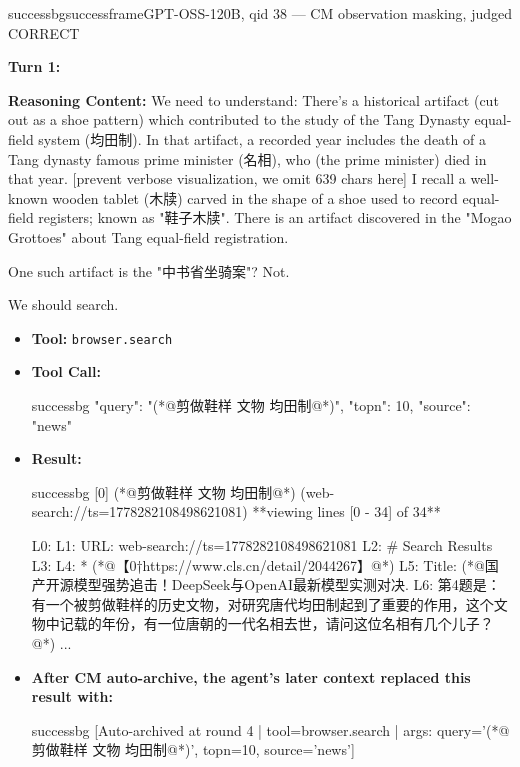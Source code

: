 \begin{casebox}{successbg}{successframe}{GPT-OSS-120B, qid 38 --- CM observation masking, judged CORRECT}

\textbf{Turn 1:}

\textbf{Reasoning Content:} We need to understand: There's a historical artifact (cut out as a shoe pattern) which contributed to the study of the Tang Dynasty equal-field system (均田制). In that artifact, a recorded year includes the death of a Tang dynasty famous prime minister (名相), who (the prime minister) died in that year.
[prevent verbose visualization, we omit 639 chars here]
I recall a well-known wooden tablet (木牍) carved in the shape of a shoe used to record equal-field registers; known as "鞋子木牍". There is an artifact discovered in the "Mogao Grottoes" about Tang equal-field registration.

One such artifact is the "中书省坐骑案"? Not.

We should search.

\vspace{0.3em}
\begin{itemize}[nosep, leftmargin=*, label={}]
    \item \textbf{Tool:} \texttt{browser.search}
    \item \textbf{Tool Call:}
    \vspace{-0.5em}
    \begin{toolcall}{successbg}
{"query": "(*@剪做鞋样 文物 均田制@*)", "topn": 10, "source": "news"}
    \end{toolcall}
    \vspace{-0.5em}
    \item \textbf{Result:}
    \vspace{-0.5em}
    \begin{casecode}{successbg}
[0] (*@剪做鞋样 文物 均田制@*) (web-search://ts=1778282108498621081)
**viewing lines [0 - 34] of 34**

L0: 
L1: URL: web-search://ts=1778282108498621081
L2: \# Search Results
L3: 
L4:   * (*@【0†https://www.cls.cn/detail/2044267】@*)
L5:  Title: (*@国产开源模型强势追击！DeepSeek与OpenAI最新模型实测对决. 
L6: 第4题是：有一个被剪做鞋样的历史文物，对研究唐代均田制起到了重要的作用，这个文物中记载的年份，有一位唐朝的一代名相去世，请问这位名相有几个儿子？@*)
...
    \end{casecode}
    \item \textbf{After CM auto-archive, the agent's later context replaced this result with:}
    \vspace{-0.5em}
    \begin{casecode}{successbg}
[Auto-archived at round 4 | tool=browser.search | args: query='(*@剪做鞋样 文物 均田制@*)', topn=10, source='news']
    \end{casecode}
\end{itemize}
\vspace{1em}


\end{casebox}
